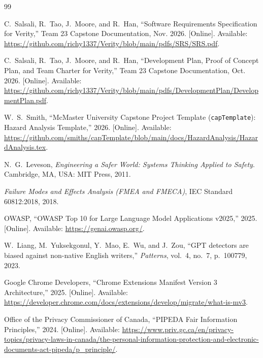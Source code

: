 \documentclass[11pt]{article}
\begin{document}
\begin{thebibliography}{99}

C.~Salsali, R.~Tao, J.~Moore, and R.~Han, ``Software Requirements Specification for Verity,'' Team 23 Capstone Documentation, Nov. 2026. [Online]. Available: \url{https://github.com/richy1337/Verity/blob/main/pdfs/SRS/SRS.pdf}.

C.~Salsali, R.~Tao, J.~Moore, and R.~Han, ``Development Plan, Proof of Concept Plan, and Team Charter for Verity,'' Team 23 Capstone Documentation, Oct. 2026. [Online]. Available: \url{https://github.com/richy1337/Verity/blob/main/pdfs/DevelopmentPlan/DevelopmentPlan.pdf}.

W.~S.~Smith, ``McMaster University Capstone Project Template (\texttt{capTemplate}): Hazard Analysis Template,'' 2026. [Online]. Available: \url{https://github.com/smiths/capTemplate/blob/main/docs/HazardAnalysis/HazardAnalysis.tex}.

N.~G.~Leveson, \emph{Engineering a Safer World: Systems Thinking Applied to Safety}. Cambridge, MA, USA: MIT Press, 2011.

\emph{Failure Modes and Effects Analysis (FMEA and FMECA)}, IEC Standard 60812:2018, 2018.

OWASP, ``OWASP Top 10 for Large Language Model Applications v2025,'' 2025. [Online]. Available: \url{https://genai.owasp.org/}.

W.~Liang, M.~Yuksekgonul, Y.~Mao, E.~Wu, and J.~Zou, ``GPT detectors are biased against non-native English writers,'' \emph{Patterns}, vol.~4, no.~7, p.~100779, 2023.

Google Chrome Developers, ``Chrome Extensions Manifest Version 3 Architecture,'' 2025. [Online]. Available: \url{https://developer.chrome.com/docs/extensions/develop/migrate/what-is-mv3}.

Office of the Privacy Commissioner of Canada, ``PIPEDA Fair Information Principles,'' 2024. [Online]. Available: \url{https://www.priv.gc.ca/en/privacy-topics/privacy-laws-in-canada/the-personal-information-protection-and-electronic-documents-act-pipeda/p_principle/}.

\end{thebibliography}

\newpage

\end{document}
